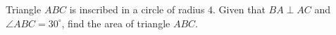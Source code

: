 Triangle $ABC$ is inscribed in a circle of radius $4$. Given that $BA\perp AC$ and $\angle ABC=30^\circ$, find the area of triangle $ABC$.

